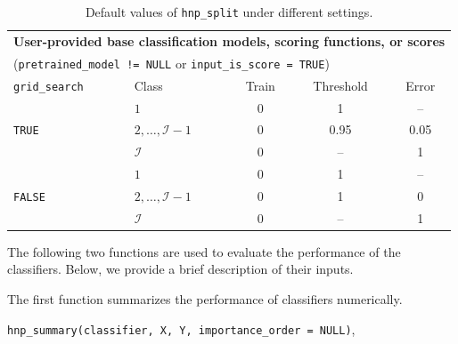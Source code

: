 \begin{itemize}
\begin{table}[ht]
\begin{tabular}{l|l|ccc}
\hline
\multicolumn{5}{l}{\textbf{User-provided base classification models, scoring functions, or scores}} \\
\multicolumn{5}{l}{(\texttt{pretrained\_model != NULL} or \texttt{input\_is\_score = TRUE})} \\
\hline
\texttt{grid\_search} & Class & Train & Threshold & Error \\
\hline
\multirow{3}{*}{\texttt{TRUE}} 
& \(1\) & 0 & 1 & -- \\
& \(2, \ldots, \mathcal{I}-1\) & 0 & 0.95 & 0.05 \\
& \(\mathcal{I}\) & 0 & -- & 1 \\
\hline
\multirow{3}{*}{\texttt{FALSE}} 
& \(1\) & 0 & 1 & -- \\
& \(2, \ldots, \mathcal{I}-1\) & 0 & 1 & 0 \\
& \(\mathcal{I}\) & 0 & -- & 1 \\
\hline
\end{tabular}
\caption{Default values of \texttt{hnp\_split} under different settings.}
\label{tab:hnp_split_default}
\end{table}






\end{itemize}


The following two functions are used to evaluate the performance of the classifiers. Below, we provide a brief description of their inputs.


\medskip
\noindent
The first function summarizes the performance of classifiers numerically.

\texttt{hnp\_summary(classifier, X, Y, importance\_order = NULL)},

